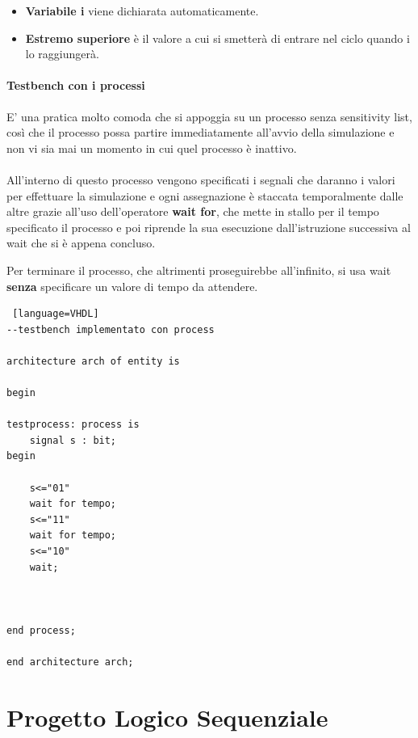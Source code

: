 \documentclass[a4paper]{book}
\begin{document}
\begin{itemize}

\item\textbf{Variabile i} viene dichiarata automaticamente.

\item\textbf{Estremo superiore} è il valore a cui si smetterà di entrare nel ciclo quando i lo raggiungerà.

\end{itemize}



\subsubsection{Testbench con i processi}

E' una pratica molto comoda che si appoggia su un processo senza sensitivity list, così che il processo possa partire immediatamente all'avvio della simulazione e non vi sia mai un momento in cui quel processo è inattivo.\\ \\
All'interno di questo processo vengono specificati i segnali che daranno i valori per effettuare la simulazione e ogni assegnazione è staccata temporalmente dalle altre grazie all'uso dell'operatore \textbf{wait for}, che mette in stallo per il tempo specificato il processo e poi riprende la sua esecuzione dall'istruzione successiva al wait che si è appena concluso.

Per terminare il processo, che altrimenti proseguirebbe all'infinito, si usa wait \textbf{senza} specificare un valore di tempo da attendere.

\begin{lstlisting} [language=VHDL]
--testbench implementato con process

architecture arch of entity is 

begin

testprocess: process is
	signal s : bit;
begin

	s<="01"
	wait for tempo;
	s<="11"
	wait for tempo;
	s<="10"
	wait;
	
	

end process;

end architecture arch;
\end{lstlisting}



\chapter{Progetto Logico Sequenziale}
\end{document}

